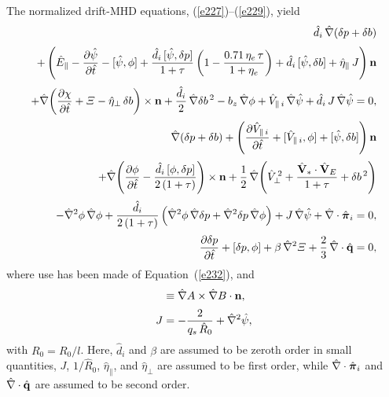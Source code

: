 \documentclass[notitlepage,12pt]{article}
\newcommand{\bpi}{\mbox{\boldmath$\pi$}}
\begin{document}
 The normalized drift-MHD equations, (\ref{e227})--(\ref{e229}), yield 
 \begin{align}\label{e247}
 \hat{d}_i\,\hat{\nabla}(\delta p + \delta b)\nonumber\\[0.5ex]+ \left(\hat{E}_{\parallel}-\frac{\partial\hat{\psi}}{\partial \hat{t}} - [\hat{\psi},\phi]+ \frac{\hat{d}_i\,[\hat{\psi},\delta p]}{1+\tau}\left(1-\frac{0.71\,\eta_e\,\tau}{1+\eta_e}\right)
 + \hat{d}_i\,[\hat{\psi},\delta b]+ \hat{\eta}_\parallel\,J\right){\bf n}\nonumber\\[0.5ex]
 +\hat{\nabla}\!\left(\frac{\partial\chi}{\partial \hat{t}} + {\mit\Xi} -\hat{\eta}_\perp\,\delta b\right)\times {\bf n} + \frac{\hat{d}_i}{2}\,\hat{\nabla}\delta b^{\,2}- b_z\,\hat{\nabla}\phi + \hat{V}_{\parallel\,i}\,\hat{\nabla}\hat{\psi}
+  \hat{d}_i\,J\,\hat{\nabla}\hat{\psi}= 0,\\[0.5ex]
 \hat{\nabla}(\delta p + \delta b) + \left(\frac{\partial \hat{V}_{\parallel\,i}}{\partial \hat{t}} + [\hat{V}_{\parallel\,i},\phi] + [\hat{\psi},\delta b]\right){\bf n}\nonumber\\[0.5ex]
 +\hat{\nabla}\!\left(\frac{\partial\phi}{\partial \hat{t}} - \frac{\hat{d}_i\,[\phi,\delta p]}{2\,(1+\tau)}\right)\times {\bf n} 
 + \frac{1}{2}\,\hat{\nabla}\!
 \left(\hat{V}_\perp^{\,2}+ \frac{\hat{\bf V}_\ast\cdot\hat{\bf V}_E }{1+\tau}+ \delta b^{\,2}\right)  \nonumber\\[0.5ex]
-\hat{\nabla}^2\phi\,\hat{\nabla}\phi + \frac{\hat{d}_i}{2\,(1+\tau)}\left(\hat{\nabla}^2\phi\,\hat{\nabla}\delta p +\hat{\nabla}^2\delta p\,\hat{\nabla}\phi\right) + J\,\hat{\nabla}\hat{\psi} + \hat{\nabla}\cdot\hat{\bpi}_i = 0,\label{e248}\\[0.5ex]
\frac{\partial \delta p}{\partial \hat{t}} + [\delta p,\phi] +\beta\,\hat{\nabla}^2{\mit\Xi} + \frac{2}{3}\,\hat{\nabla}\cdot \hat{\bf q}= 0,\label{e249}
 \end{align}
 where use has been made of Equation~(\ref{e232}), and
 \begin{align}
 [A,B] &\equiv \hat{\nabla} A\times \hat{\nabla} B\cdot{\bf n},\\[0.5ex]
 J &= -\frac{2}{q_s\,\hat{R}_0}+ \hat{\nabla}^2\hat{\psi},\label{eJ}
 \end{align}
 with $R_0=R_0/l$. 
 Here, $\hat{d}_i$ and $\beta$ are assumed to be zeroth order in small quantities, $J$, $1/\hat{R}_0$, $\hat{\eta}_\parallel$, and $\hat{\eta}_\perp$ are assumed to be first order, while $\hat{\nabla}\cdot \hat{\bpi}_{i}$ and $\hat{\nabla}\cdot\hat{\bf q}$ are assumed to be second order. 
 
\end{document}
